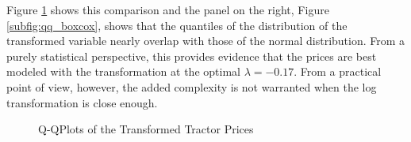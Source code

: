 \documentclass[11pt]{book}
\begin{document}
Figure \ref{fig:qq_prices} shows this comparison
and the panel on the right, Figure \ref{subfig:qq_boxcox}, 
shows that the quantiles of the distribution of the transformed variable
nearly overlap with those of the normal distribution.
From a purely statistical perspective, 
this provides evidence that the prices are best modeled with the transformation
at the optimal $\lambda = -0.17$.
From a practical point of view, however, 
the added complexity is not warranted
when the log transformation is close enough.


\begin{figure}[!ht]
\hfill
{}

\caption{Q-QPlots of the Transformed Tractor Prices}
\label{fig:qq_prices}
\end{figure}








\end{document}
